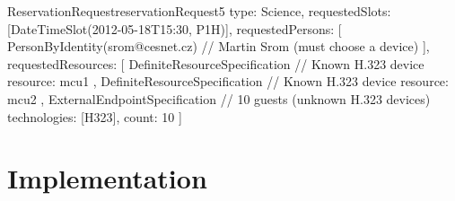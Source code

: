 \begin{enumerate}
\begin{EntityExample}{ReservationRequest}{reservationRequest5}{}
type: Science,
requestedSlots: [DateTimeSlot(2012-05-18T15:30, P1H)],
requestedPersons: [
  PersonByIdentity(srom@cesnet.cz) // Martin Srom (must choose a device)
],
requestedResources: [
  DefiniteResourceSpecification { // Known H.323 device
    resource: mcu1
  },
  DefiniteResourceSpecification { // Known H.323 device
    resource: mcu2
  },
  ExternalEndpointSpecification { // 10 guests (unknown H.323 devices)
    technologies: [H323],
    count: 10
  }
]
\end{EntityExample}

\end{enumerate}


\section{Implementation}

